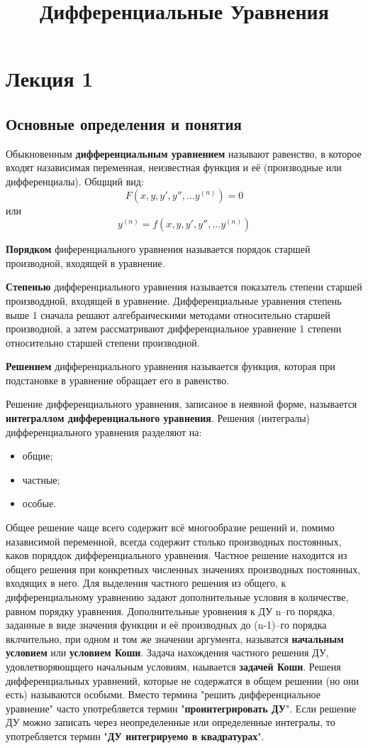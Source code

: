 \documentclass[oneside,final,14pt]{extreport}
\begin{document}
\title{Дифференциальные Уравнения}

\maketitle

\chapter*{Лекция 1}
\section{Основные определения и понятия}
Обыкновенным \textbf{дифференциальным уравнением} называют равенство, в которое входят назависимая переменная, неизвестная функция и её (производные или дифференциалы). Общщий вид: \[F(x,y,y',y'',\ldots y^{(n)})=0\] или \[y^{(n)}=f(x,y,y',y'',\ldots y^{(n)})\]

\textbf{Порядком} фиференциального уравнения называется порядок старшей производной, входящей в уравнение.

\textbf{Степенью} дифференциального уравнения называется показатель степени старшей производдной, входящей в уравнение. Дифференциальные уравнения степень выше 1 сначала решают алгебраическими методами относительно старшей производной, а затем рассматривают дифференциальное уравнение 1 степени относительно старшей степени производной.

\textbf{Решением} дифференциального уравнения называется функция, которая при подстановке в уравнение обращает его в равенство.

Решение дифференциального уравнения, записаное в неявной форме, называется \textbf{интеграллом дифференциального уравнения}. Решения (интегралы) дифференциального уравнения разделяют на:
\begin{itemize}
	\item общие;
	\item частные;
	\item особые.
\end{itemize}

Общее решение чаще всего содержит всё многообразие решений и, помимо назависимой переменной, всегда содержит столько производных постоянных, каков поряддок дифференциального уравнения.
Частное решение находится из общего решения при конкретных численных значениях производных постоянных, входящих в него. Для выделения частного решения из общего, к дифференциальному уравнению задают дополнительные условия в количестве, равном порядку уравнения. Дополнительные уровнения к ДУ n--го порядка, заданные в виде значения функции и её производных до (n-1)--го порядка вклчительно, при одном и том же значении аргумента, называтся \textbf{начальным условием} или \textbf{условием Коши}.
Задача нахождения частного решения ДУ, удовлетворяющщего начальным условиям, наывается \textbf{задачей Коши}.
Решеия дифференциальных уравнений, которые не содержатся в общем решении (но они есть) называются особыми.
Вместо термина "решить дифференциальное уравнение" часто употребляется термин "\textbf{проинтегрировать ДУ}". Если решение ДУ можно записать через неопределенные или определенные интегралы, то употребляется термин "\textbf{ДУ интегрируемо в квадратурах}".
\end{document}
